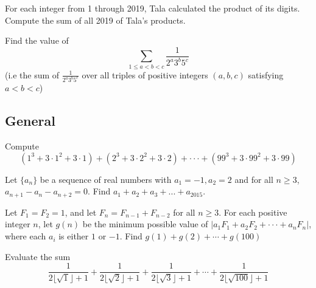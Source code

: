 \documentclass[11pt]{article}
\begin{document}

\begin{prob}{4}

For each integer from 1 through 2019, Tala calculated the product of
its digits. Compute the sum of all 2019 of Tala’s products.
\end{prob}

%

\begin{req}{6}

Find the value of
$$\sum_{1\leq a<b<c} \frac{1}{2^{a}3^{b}5^{c}}$$
(i.e the sum of $\frac{1}{2^{a}3^{b}5^{c}}$ over all triples of positive integers $(a, b, c)$ satisfying $a < b < c$)
\end{req}


\subsection{General}

\begin{prob}{2}
Compute
$$(1^3 + 3 \cdot 1^2 + 3 \cdot 1) + (2^3 + 3 \cdot 2^2 + 3 \cdot 2) + · · · + (99^3 + 3 \cdot 99^2 + 3 \cdot 99)$$
\end{prob}

\begin{prob}[BMT 2015]{2}
Let $\{a_n\}$ be a sequence of real numbers with $a_1 = -1, a_2 = 2$ and for all $n \ge 3$,
$a_{n+1} - a_{n} - a_{n+2} = 0$.
Find $a_{1} + a_{2} + a_{3} + . . . + a_{2015}$.
\end{prob}

\begin{prob}[MMATHS 2019]{2}
 Let $F_1 = F_2 = 1$, and let $F_n = F_{n-1} + F_{n-2}$ for all $n \ge 3$. For each positive integer $n$, let $g(n)$ be the minimum possible value of
$|a_1F_1 + a_2F_2 + · · · + a_nF_n|$,
where each $a_i$
is either $1$ or $-1$. Find $g(1) + g(2) + \cdots  + g(100)$
\end{prob}

\begin{prob}{4}
Evaluate the sum
$$\frac{1}{2\lfloor \sqrt{1} \rfloor + 1} +\frac{1}{2\lfloor \sqrt{2} \rfloor + 1}+\frac{1}{2\lfloor \sqrt{3} \rfloor + 1} + \cdots + \frac{1}{2\lfloor \sqrt{100} \rfloor + 1}$$ 
\end{prob}

\end{document}
